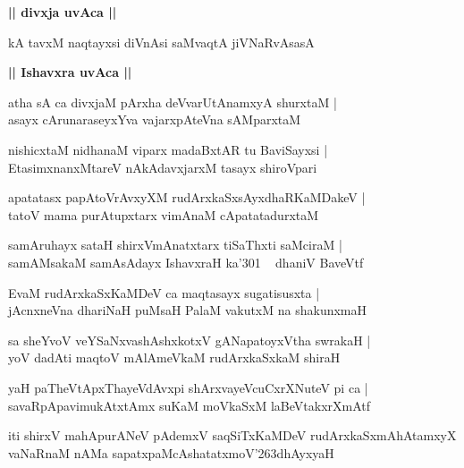 \documentclass[twoside,12pt,openright]{book}
\def\S{\char'263}
\newcounter{shloka}[chapter]
\def\uvaca#1{\centerline{{\large\textbf{#1}}}}
\begin{document}
\uvaca{|| divxja uvAca ||}

\begin{shloka}%
kA tavxM naqtayxsi diVnAsi saMvaqtA jiVNaRvAsasA
\end{shloka}

\uvaca{|| Ishavxra uvAca ||}

\begin{shloka}%
atha sA ca divxjaM pArxha deVvarUtAnamxyA shurxtaM |\\
asayx cArunaraseyxYva vajarxpAteVna sAMparxtaM 
\end{shloka}

\begin{shloka}%
nishicxtaM nidhanaM viparx madaBxtAR tu BaviSayxsi |\\
EtasimxnanxMtareV nAkAdavxjarxM tasayx shiroVpari 
\end{shloka}

\begin{shloka}%
apatatasx papAtoVrAvxyXM rudArxkaSxsAyxdhaRKaMDakeV |\\
tatoV mama purAtupxtarx vimAnaM cApatatadurxtaM 
\end{shloka}

\begin{shloka}%
samAruhayx sataH shirxVmAnatxtarx tiSaThxti saMciraM |\\
samAMsakaM samAsAdayx IshavxraH ka\char'301 ~ dhaniV BaveVtf
\end{shloka}

\begin{shloka}%
EvaM rudArxkaSxKaMDeV ca maqtasayx sugatisusxta |\\
jAcnxneVna dhariNaH puMsaH PalaM vakutxM na shakunxmaH 
\end{shloka}

\begin{shloka}%
sa sheYvoV veYSaNxvashAshxkotxV gANapatoyxVtha swrakaH |\\
yoV dadAti maqtoV mAlAmeVkaM rudArxkaSxkaM shiraH 
\end{shloka}

\begin{shloka}%
yaH paTheVtApxThayeVdAvxpi shArxvayeVcuCxrXNuteV pi ca |\\
savaRpApavimukAtxtAmx suKaM moVkaSxM laBeVtakxrXmAtf
\end{shloka}

\begin{center}
iti shirxV mahApurANeV pAdemxV saqSiTxKaMDeV rudArxkaSxmAhAtamxyX vaNaRnaM nAMa 
sapatxpaMcAshatatxmoV\S dhAyxyaH 
\end{center}
\end{document}

